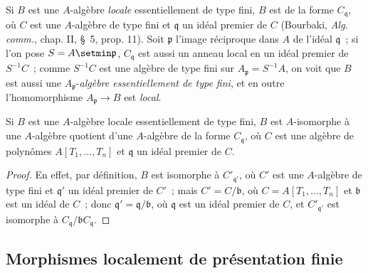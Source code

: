 
\begin{env}[1.3.10]
\label{IV.1.3.10-fr}
Si $B$ est une $A$-algèbre \emph{locale} essentiellement de type fini, $B$ est
de la forme $C_{\mathfrak q}$, où $C$ est une $A$-algèbre de type fini et
$\mathfrak q$ un idéal premier de $C$ (Bourbaki, \emph{Alg. comm.}, chap. II,
\S~5, prop. 11). Soit $\mathfrak p$ l'image réciproque dans $A$ de l'idéal
$\mathfrak q$~; si l'on pose $S=A\setmin\mathfrak p$, $C_{\mathfrak q}$ est aussi un
anneau local en un idéal premier de $S^{-1}C$~; comme $S^{-1}C$ est une
algèbre de type fini sur $A_{\mathfrak p}=S^{-1}A$, on voit que $B$ est aussi
une $A_{\mathfrak p}$-\emph{algèbre essentiellement de type fini}, et en outre
l'homomorphisme $A_{\mathfrak p}\to B$ est \emph{local}.
\end{env}

\begin{proposition}[1.3.11]
\label{IV.1.3.11-fr}
Si $B$ est une $A$-algèbre locale essentiellement de type fini, $B$ est
$A$-isomorphe à une $A$-algèbre quotient d'une $A$-algèbre de la forme
$C_{\mathfrak q}$, où $C$ est une algèbre de polynômes
$A[T_1,\ldots,T_n]$ et $\mathfrak q$ un idéal premier de $C$.
\end{proposition}

\begin{proof}
En effet, par définition, $B$ est isomorphe à $C'_{\mathfrak q'}$, où $C'$ est
une $A$-algèbre de type fini et $\mathfrak q'$ un idéal premier de $C'$~; mais
$C'=C/\mathfrak b$, où $C=A[T_1,\ldots,T_n]$ et $\mathfrak b$ est un idéal de
$C$~; donc $\mathfrak q'=\mathfrak q/\mathfrak b$, où $\mathfrak q$ est un
idéal premier de $C$, et $C'_{\mathfrak q'}$ est isomorphe à
$C_{\mathfrak q}/\mathfrak bC_{\mathfrak q}$.
\end{proof}

\subsection{Morphismes localement de présentation finie}
\label{subsection:IV.1.4-fr}

